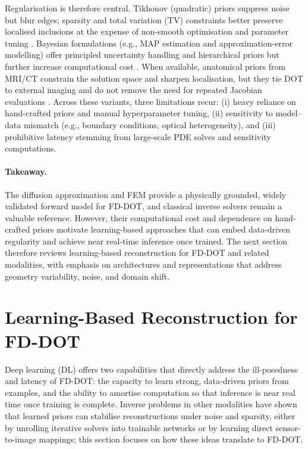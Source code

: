 Regularisation is therefore central. Tikhonov (quadratic) priors suppress noise but blur edges; sparsity and total variation (TV) constraints better preserve localised inclusions at the expense of non-smooth optimisation and parameter tuning \cite{gibson2005}. Bayesian formulations (e.g., MAP estimation and approximation‐error modelling) offer principled uncertainty handling and hierarchical priors but further increase computational cost \cite{tarvainen2010boe}. When available, anatomical priors from MRI/CT constrain the solution space and sharpen localisation, but they tie DOT to external imaging and do not remove the need for repeated Jacobian evaluations \cite{arridge1999}. Across these variants, three limitations recur: (i) heavy reliance on hand-crafted priors and manual hyperparameter tuning, (ii) sensitivity to model–data mismatch (e.g., boundary conditions, optical heterogeneity), and (iii) prohibitive latency stemming from large-scale PDE solves and sensitivity computations.

\paragraph{Takeaway.} The diffusion approximation and FEM provide a physically grounded, widely validated forward model for FD-DOT, and classical inverse solvers remain a valuable reference. However, their computational cost and dependence on hand-crafted priors motivate learning-based approaches that can embed data-driven regularity and achieve near real-time inference once trained. The next section therefore reviews learning-based reconstruction for FD-DOT and related modalities, with emphasis on architectures and representations that address geometry variability, noise, and domain shift.

\section{Learning-Based Reconstruction for FD-DOT}
Deep learning (DL) offers two capabilities that directly address the ill-posedness and latency of FD-DOT: the capacity to learn strong, data-driven priors from examples, and the ability to amortise computation so that inference is near real time once training is complete. Inverse problems in other modalities have shown that learned priors can stabilise reconstructions under noise and sparsity, either by unrolling iterative solvers into trainable networks or by learning direct sensor-to-image mappings; this section focuses on how these ideas translate to FD-DOT.

